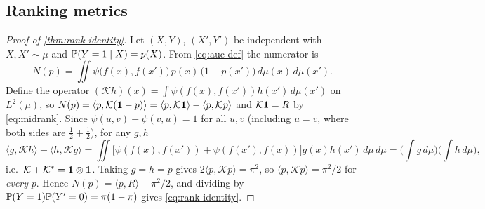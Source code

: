 \subsection{Ranking metrics}
\label{app:ranking}

\begin{proof}[Proof of \cref{thm:rank-identity}]
Let $(X,Y)$, $(X',Y')$ be independent with $X,X'\sim\mu$ and
$\mathbb{P}(Y=1\mid X)=p(X)$. From \eqref{eq:auc-def} the numerator is
\[
  N(p)=\iint \psi\big(f(x),f(x')\big)\,p(x)\,\big(1-p(x')\big)\,d\mu(x)\,d\mu(x').
\]
Define the operator $(\mathcal{K}h)(x)=\int\psi(f(x),f(x'))h(x')\,d\mu(x')$ on
$L^2(\mu)$, so $N(p)=\langle p, \mathcal{K}(\mathbf{1}-p)\rangle
= \langle p, \mathcal{K}\mathbf{1}\rangle - \langle p,\mathcal{K}p\rangle$ and
$\mathcal{K}\mathbf{1} = R$ by \eqref{eq:midrank}. Since
$\psi(u,v)+\psi(v,u)=1$ for all $u,v$ (including $u=v$, where both sides are
$\tfrac12+\tfrac12$), for any $g,h$
\[
  \langle g,\mathcal{K}h\rangle + \langle h,\mathcal{K}g\rangle
  = \iint\big[\psi(f(x),f(x'))+\psi(f(x'),f(x))\big]g(x)h(x')\,d\mu\,d\mu
  = \Big(\int g\,d\mu\Big)\Big(\int h\,d\mu\Big),
\]
i.e.\ $\mathcal{K}+\mathcal{K}^{*}=\mathbf{1}\otimes\mathbf{1}$. Taking $g=h=p$ gives
$2\langle p,\mathcal{K}p\rangle = \pi^{2}$, so
$\langle p,\mathcal{K}p\rangle = \pi^{2}/2$ for \emph{every} $p$. Hence
$N(p) = \langle p,R\rangle - \pi^2/2$, and dividing by
$\mathbb{P}(Y=1)\mathbb{P}(Y'=0)=\pi(1-\pi)$ gives \eqref{eq:rank-identity}.
\end{proof}


